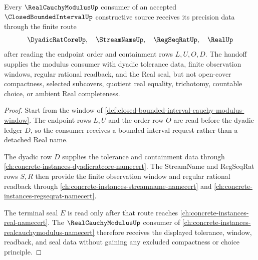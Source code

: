 \begin{theorem}
\label{thm:closed-bounded-interval-real-cauchy-modulus-handoff}
Every $\RealCauchyModulusUp$ consumer of an accepted $\ClosedBoundedIntervalUp$ constructive source receives its precision data through the finite route
$$
\DyadicRatCoreUp,\quad \StreamNameUp,\quad \RegSeqRatUp,\quad \RealUp
$$
after reading the endpoint order and containment rows $L,U,O,D$. The handoff supplies the modulus consumer with dyadic tolerance data, finite observation windows, regular rational readback, and the Real seal, but not open-cover compactness, selected subcovers, quotient real equality, trichotomy, countable choice, or ambient Real completeness.
\end{theorem}
\begin{proof}
Start from the window of \autoref{def:closed-bounded-interval-cauchy-modulus-window}. The endpoint rows $L,U$ and the order row $O$ are read before the dyadic ledger $D$, so the consumer receives a bounded interval request rather than a detached Real name.

The dyadic row $D$ supplies the tolerance and containment data through \autoref{ch:concrete-instances-dyadicratcore-namecert}. The StreamName and RegSeqRat rows $S,R$ then provide the finite observation window and regular rational readback through \autoref{ch:concrete-instances-streamname-namecert} and \autoref{ch:concrete-instances-regseqrat-namecert}.

The terminal seal $E$ is read only after that route reaches \autoref{ch:concrete-instances-real-namecert}. The $\RealCauchyModulusUp$ consumer of \autoref{ch:concrete-instances-realcauchymodulus-namecert} therefore receives the displayed tolerance, window, readback, and seal data without gaining any excluded compactness or choice principle.
\end{proof}

